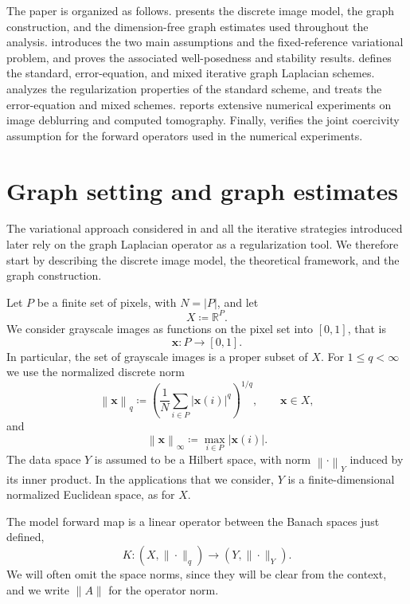 \documentclass{article}
\theoremstyle{remark}
\newcommand{\R}{\mathbb{R}}
\newcommand{\norm}[1]{\left\lVert #1 \right\rVert}
\newcommand{\bx}{{\bm{x}}}
\begin{document}
The paper is organized as follows.  presents the discrete
image model, the graph construction, and the dimension-free graph estimates used
throughout the analysis.  introduces the two main assumptions and the 
fixed-reference variational problem, and proves the associated well-posedness and
stability results.  defines the standard, error-equation,
and mixed iterative graph Laplacian schemes. 
analyzes the regularization properties of the standard scheme, and 
treats the error-equation and mixed schemes.  reports
extensive numerical experiments on image deblurring and computed tomography.
Finally,  verifies the joint coercivity assumption for the
forward operators used in the numerical experiments.




 
\section{Graph setting and graph estimates}\label{sec:graph_theory}

The variational approach considered in  and all the iterative strategies introduced later rely on the graph Laplacian operator as a regularization tool. We therefore start by describing the discrete image model, the theoretical framework, and the graph construction.

Let $P$ be a finite set of pixels, with $N=|P|$, and let 
\[
X\coloneqq\R^{P}.
\]
We consider grayscale images as functions on the pixel set into $[0,1]$, that is
\[
\bx\colon P \to [0,1].
\]
In particular, the set of grayscale images is a proper subset of $X$. For $1\le q<\infty$ we use the normalized discrete norm
\[
\norm{\bx}_q\coloneqq\left(\frac1N\sum_{i\in P}|\bx(i)|^q\right)^{1/q},
\qquad \bx\in X,
\]
and
\[
\norm{\bx}_\infty\coloneqq\max_{i\in P}|\bx(i)|.
\]
The data space $Y$ is assumed to be a Hilbert space, with norm $\norm{\cdot}_Y$ induced by its inner product. In the applications that we consider, $Y$ is a finite-dimensional normalized Euclidean space, as for $X$. 

The model forward map is a linear operator between the Banach spaces just defined,
\begin{equation}\label{eq:model_operator}
K\colon (X, \|\cdot\|_q) \to (Y, \|\cdot\|_Y).
\end{equation}
We will often omit the space norms, since they will be clear from the context, and we write $\|A\|$ for the operator norm.
\end{document}

